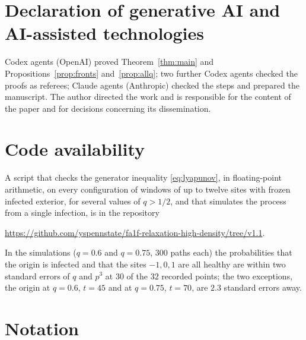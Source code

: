 \documentclass[11pt]{amsart}
\theoremstyle{remark}
\begin{document}
\section*{Declaration of generative AI and AI-assisted technologies}
Codex agents (OpenAI) proved Theorem~\ref{thm:main} and Propositions~\ref{prop:fronts} and~\ref{prop:allq}; two further
Codex agents checked the proofs as referees; Claude agents (Anthropic) checked the steps and prepared the manuscript.
The author directed the work and is responsible for the content of the paper and for decisions concerning its
dissemination.

\section*{Code availability}
A script that checks the generator inequality \eqref{eq:lyapunov}, in floating-point arithmetic, on every configuration of
windows of up to twelve sites with frozen infected exterior, for several values of $q>1/2$, and that simulates the process from a single
infection, is in the repository
\begin{center}\url{https://github.com/yspennstate/fa1f-relaxation-high-density/tree/v1.1}.\end{center}
In the simulations ($q=0.6$ and $q=0.75$, $300$ paths each) the probabilities that the origin is infected and that
the sites $-1,0,1$ are all healthy are within two standard errors of $q$ and $p^3$ at $30$ of the $32$ recorded points; the two
exceptions, the origin at $q=0.6$, $t=45$ and at $q=0.75$, $t=70$, are $2.3$ standard errors away.

\appendix
\section{Notation}\label{app:notation}
\end{document}
